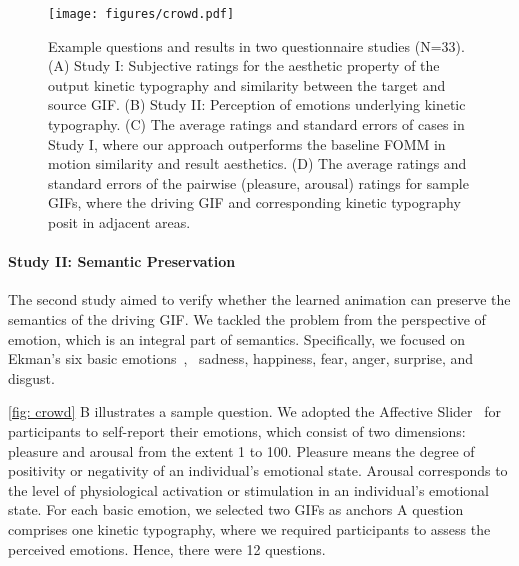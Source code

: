 \begin{figure*}[h!]
  \centering
  \texttt{[image: figures/crowd.pdf]}
  \caption{Example questions and results in two questionnaire studies (N=33). (A) Study I: Subjective ratings for the aesthetic property of the output kinetic typography and similarity between the target and source GIF. (B) Study II: Perception of emotions underlying kinetic typography. (C) The average ratings and standard errors of cases in Study I, where our approach outperforms the baseline FOMM in motion similarity and result aesthetics. (D) The average ratings and standard errors of the pairwise (pleasure, arousal) ratings for sample GIFs, where the driving GIF and corresponding kinetic typography posit in adjacent areas. }
  \label{fig: crowd}
\end{figure*}
\paragraph{Study II: Semantic Preservation}

The second study aimed to verify whether the learned animation can preserve the semantics of the driving GIF.
We tackled the problem from the perspective of emotion, which is an integral part of semantics.
Specifically, we focused on Ekman's six basic emotions~\cite{ekman1999basic}, \ie~sadness, happiness, fear, anger, surprise, and disgust.

\autoref{fig: crowd} B illustrates a sample question. We adopted the Affective Slider~\cite{betella2016affective} for participants to self-report their emotions, which consist of two dimensions: pleasure and arousal from the extent 1 to 100.
Pleasure means the degree of positivity or negativity of an individual's emotional state.
Arousal corresponds to the level of physiological activation or stimulation in an individual's emotional state.
For each basic emotion, we selected two GIFs as anchors 
A question comprises one kinetic typography, where we required participants to assess the perceived emotions.
Hence, there were 12 questions.

